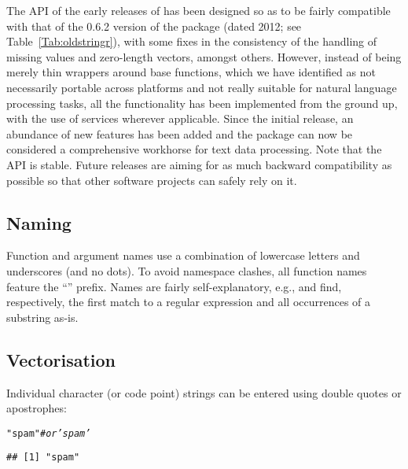 \documentclass[nojss]{jss}\usepackage[]{graphicx}\usepackage[]{xcolor}
\makeatletter
\newcommand{\hlstr}[1]{\textcolor[rgb]{0.192,0.494,0.8}{#1}}%
\newcommand{\hlcom}[1]{\textcolor[rgb]{0.678,0.584,0.686}{\textit{#1}}}%
\newenvironment{kframe}{%
 \def\at@end@of@kframe{}%
 \ifinner\ifhmode%
  \def\at@end@of@kframe{\end{minipage}}%
  \begin{minipage}{\columnwidth}%
 \fi\fi%
 \def\FrameCommand##1{\hskip\@totalleftmargin \hskip-\fboxsep
 \colorbox{shadecolor}{##1}\hskip-\fboxsep
     \hskip-\linewidth \hskip-\@totalleftmargin \hskip\columnwidth}%
 \MakeFramed {\advance\hsize-\width
   \@totalleftmargin\z@ \linewidth\hsize
   \@setminipage}}%
 {\par\unskip\endMakeFramed%
 \at@end@of@kframe}
\newenvironment{knitrout}{}{} %
\makeatother
\begin{document}
The API of the early releases of  has been designed so as
to be fairly compatible with that of the 0.6.2 version of the
 package
\citep{Wickham2010:stringr} (dated 2012; see Table~\ref{Tab:oldstringr}),
with some fixes in the
consistency of the handling of missing values and zero-length vectors,
amongst others.
However, instead of being merely thin wrappers around base 
functions, which we have identified as not necessarily portable across
platforms and not really suitable for natural language processing tasks,
all the functionality has been implemented from the ground up,
with the use of  services wherever applicable. Since the
initial release, an abundance of new features has been added
and the package can now be considered a comprehensive workhorse
for text data processing.
Note that the  API is stable.
Future releases are aiming for as much backward compatibility
as possible so that other software projects can safely rely on it.








\subsection{Naming}

Function and argument names use a combination of lowercase letters
and underscores (and no dots). To avoid namespace clashes,
all function names feature the ``'' prefix.
Names are fairly self-explanatory, e.g.,
 and 
find, respectively, the first match to a regular expression and
all occurrences of a substring as-is.





\subsection{Vectorisation}

Individual character (or code point) strings can be entered using
double quotes or apostrophes:

\begin{knitrout}
\color{fgcolor}\begin{kframe}
\begin{alltt}
\hlstr{"spam"}  \hlcom{# or 'spam'}
\end{alltt}
\begin{verbatim}
## [1] "spam"
\end{verbatim}
\end{kframe}
\end{knitrout}
\end{document}
